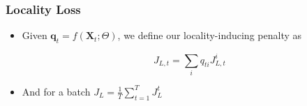 \begin{frame}
	\frametitle{Locality Loss}
	\begin{itemize}
		\item Given $\mathbf{q}_t = f(\mathbf{X}_t; \Theta)$, we define our locality-inducing
			penalty as
			\begin{block}{}
				\begin{equation*}
					J_{L,t} = \sum_{i} q_{ti} J_{L,t}^i
				\end{equation*}
			\end{block}
		\item And for a batch $J_L =  \frac{1}{T} \sum_{t=1}^T J_L^t$
	\end{itemize}
\end{frame}
